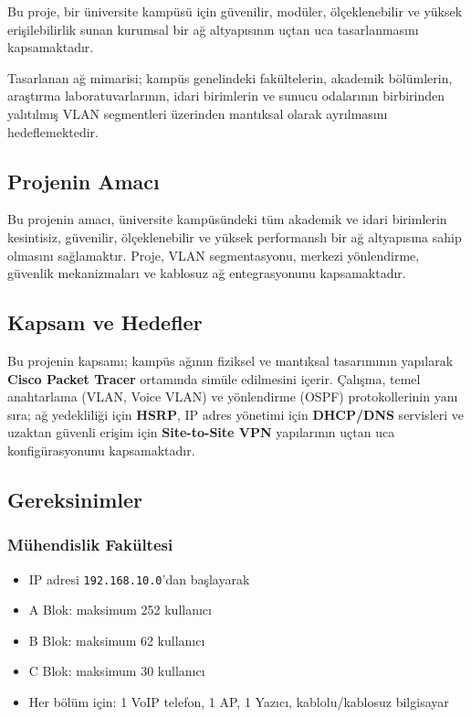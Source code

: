 \documentclass[12pt,a4paper]{article}
\begin{document}
Bu proje, bir üniversite kampüsü için güvenilir, modüler, ölçeklenebilir ve yüksek erişilebilirlik sunan kurumsal bir ağ altyapısının uçtan uca tasarlanmasını kapsamaktadır.

\begin{infobox}
Tasarlanan ağ mimarisi; kampüs genelindeki fakültelerin, akademik bölümlerin, araştırma laboratuvarlarının, idari birimlerin ve sunucu odalarının birbirinden yalıtılmış VLAN segmentleri üzerinden mantıksal olarak ayrılmasını hedeflemektedir.
\end{infobox}

\subsection{Projenin Amacı}
Bu projenin amacı, üniversite kampüsündeki tüm akademik ve idari birimlerin kesintisiz, güvenilir, ölçeklenebilir ve yüksek performanslı bir ağ altyapısına sahip olmasını sağlamaktır. Proje, VLAN segmentasyonu, merkezi yönlendirme, güvenlik mekanizmaları ve kablosuz ağ entegrasyonunu kapsamaktadır.

\subsection{Kapsam ve Hedefler}
Bu projenin kapsamı; kampüs ağının fiziksel ve mantıksal tasarımının yapılarak \textbf{Cisco Packet Tracer} ortamında simüle edilmesini içerir. Çalışma, temel anahtarlama (VLAN, Voice VLAN) ve yönlendirme (OSPF) protokollerinin yanı sıra; ağ yedekliliği için \textbf{HSRP}, IP adres yönetimi için \textbf{DHCP/DNS} servisleri ve uzaktan güvenli erişim için \textbf{Site-to-Site VPN} yapılarının uçtan uca konfigürasyonunu kapsamaktadır.

\subsection{Gereksinimler}

\subsubsection{Mühendislik Fakültesi}
\begin{itemize}[noitemsep]
  \item IP adresi \texttt{192.168.10.0}'dan başlayarak
  \item A Blok: maksimum 252 kullanıcı
  \item B Blok: maksimum 62 kullanıcı
  \item C Blok: maksimum 30 kullanıcı
  \item Her bölüm için: 1 VoIP telefon, 1 AP, 1 Yazıcı, kablolu/kablosuz bilgisayar
\end{itemize}
\end{document}
